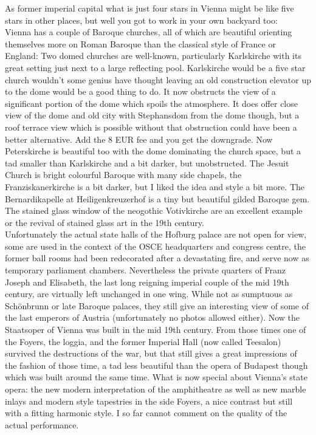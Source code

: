 As former imperial capital what is just four stars in Vienna might be like five stars in other places, but well you got to work in your own backyard too:\\
Vienna has a couple of Baroque churches, all of which are beautiful orienting themselves more on Roman Baroque than the classical style of France or England: Two domed churches are well-known, particularly Karlskirche with its great setting just next to a large reflecting pool. Karlskirche would be a five star church wouldn't some genius have thought leaving an old construction elevator up to the dome would be a good thing to do. It now obstructs the view of a significant portion of the dome which spoils the atmosphere. It does offer close view of the dome and old city with Stephansdom from the dome though, but a roof terrace view which is possible without that obstruction could have been a better alternative. Add the 8 EUR fee and you get the downgrade. Now Peterskirche is beautiful too with the dome dominating the church space, but a tad smaller than Karlskirche and a bit darker, but unobstructed. The Jesuit Church is bright colourful Baroque with many side chapels, the Franziskanerkirche is a bit darker, but I liked the idea and style a bit more. The Bernardikapelle at Heiligenkreuzerhof is a tiny but beautiful gilded Baroque gem. The stained glass window of the neogothic Votivkirche are an excellent example or the revival of stained glass art in the 19th century.\\
Unfortunately the actual state halls of the Hofburg palace are not open for view, some are used in the context of the OSCE headquarters and congress centre, the former ball rooms had been redecorated after a devastating fire, and serve now as temporary parliament chambers. Nevertheless the private quarters of Franz Joseph and Elisabeth, the last long reigning imperial couple of the mid 19th century, are virtually left unchanged in one wing. While not as sumptuous as Sch\"onbrunn or late Baroque palaces, they still give an interesting view of some of the last emperors of Austria (unfortunately no photos allowed either). Now the Staatsoper of Vienna was built in the mid 19th century. From those times one of the Foyers, the loggia, and the former Imperial Hall (now called Teesalon) survived the destructions of the war, but that still gives a great impressions of the fashion of those time, a tad less beautiful than the opera of Budapest though which was built around the same time. What is now special about Vienna's state opera: the new modern interpretation of the amphitheatre as well as new marble inlays and modern style tapestries in the side Foyers, a nice contrast but still with a fitting harmonic style. I so far cannot comment on the quality of the actual performance.\\
